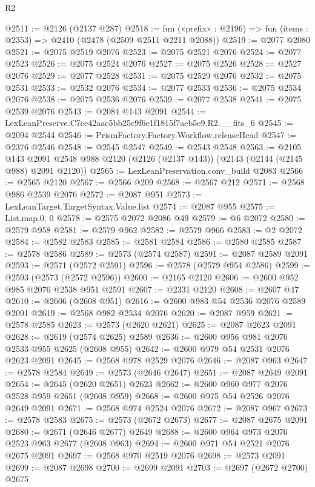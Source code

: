 \begin{lexlean}{R2}
\begin{coremodule}
@2511 := @2126 (@2137 @287)
@2518 := fun («prefix» : @2196) => fun (items : @2353) => @2410 (@2478 (@2509 @2511 @2211 @2088))
@2519 := @2077 @2080
@2521 := @2075 @2519 @2076
@2523 := @2075 @2521 @2076
@2524 := @2077 @2523
@2526 := @2075 @2524 @2076
@2527 := @2075 @2526
@2528 := @2527 @2076
@2529 := @2077 @2528
@2531 := @2075 @2529 @2076
@2532 := @2075 @2531
@2533 := @2532 @2076
@2534 := @2077 @2533
@2536 := @2075 @2534 @2076
@2538 := @2075 @2536 @2076
@2539 := @2077 @2538
@2541 := @2075 @2539 @2076
@2543 := @2084 @143 @2091
@2544 := LexLeanPreserve.C7ce42aac5bb25c9f6e1f1815f7aeb5e9.R2.__fits_6
@2545 := @2094 @2544
@2546 := PrismFactory.Factory.Workflow.releaseHead
@2547 := @2376 @2546
@2548 := @2545 @2547
@2549 := @2543 @2548
@2563 := @2105
    @143
    @2091
    @2548
    @988
    @2120
    (@2126 (@2137 @143))
    (@2143 (@2144 (@2145 @988) @2091 @2120))
@2565 := LexLeanPreservation.conv_build @2083
@2566 := @2565 @2120
@2567 := @2566 @209
@2568 := @2567 @212
@2571 := @2568 @986 @2539 @2076
@2572 := @2087 @951
@2573 := LexLeanTarget.TargetSyntax.Value.list
@2574 := @2087 @955
@2575 := List.map.{0, 0}
@2578 := @2575 @2072 @2086 @49
@2579 := @6 @2072
@2580 := @2579 @958
@2581 := @2579 @962
@2582 := @2579 @966
@2583 := @2 @2072
@2584 := @2582 @2583
@2585 := @2581 @2584
@2586 := @2580 @2585
@2587 := @2578 @2586
@2589 := @2573 (@2574 @2587)
@2591 := @2087 @2589 @2091
@2593 := @2571 (@2572 @2591)
@2596 := @2578 (@2579 @954 @2586)
@2599 := @2593 (@2573 (@2572 @2596))
@2600 := @2165 @2120
@2606 := @2600 @952 @985 @2076 @2538 @951 @2591
@2607 := @2331 @2120
@2608 := @2607 @47
@2610 := @2606 (@2608 @951)
@2616 := @2600 @983 @54 @2536 @2076 @2589 @2091
@2619 := @2568 @982 @2534 @2076
@2620 := @2087 @959
@2621 := @2578 @2585
@2623 := @2573 (@2620 @2621)
@2625 := @2087 @2623 @2091
@2628 := @2619 (@2574 @2625) @2589
@2636 := @2600 @956 @981 @2076 @2533 @955 @2625 (@2608 @955)
@2642 := @2600 @979 @54 @2531 @2076 @2623 @2091
@2645 := @2568 @978 @2529 @2076
@2646 := @2087 @963
@2647 := @2578 @2584
@2649 := @2573 (@2646 @2647)
@2651 := @2087 @2649 @2091
@2654 := @2645 (@2620 @2651) @2623
@2662 := @2600 @960 @977 @2076 @2528 @959 @2651 (@2608 @959)
@2668 := @2600 @975 @54 @2526 @2076 @2649 @2091
@2671 := @2568 @974 @2524 @2076
@2672 := @2087 @967
@2673 := @2578 @2583
@2675 := @2573 (@2672 @2673)
@2677 := @2087 @2675 @2091
@2680 := @2671 (@2646 @2677) @2649
@2688 := @2600 @964 @973 @2076 @2523 @963 @2677 (@2608 @963)
@2694 := @2600 @971 @54 @2521 @2076 @2675 @2091
@2697 := @2568 @970 @2519 @2076
@2698 := @2573 @2091
@2699 := @2087 @2698
@2700 := @2699 @2091
@2703 := @2697 (@2672 @2700) @2675

\end{coremodule}
\end{lexlean}
